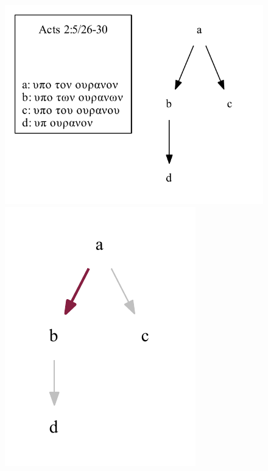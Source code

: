 \documentclass[a4paper, 12pt]{article}
\begin{document}
	\begin{figure}[h!]
		\centering
		\includegraphics[scale=0.6666]{../graphics/B05K2V5U26-30-local-stemma.pdf}\\
		\includegraphics[scale=0.6666]{../graphics/B05K2V5U26-30-local-stemma-path-1.pdf}

\end{figure}
\end{document}
